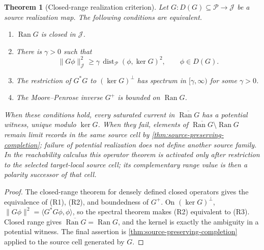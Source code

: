 \documentclass[11pt]{article}
\numberwithin{section}{part}
\theoremstyle{plain}
\newtheorem{theorem}{Theorem}[section]
\theoremstyle{definition}
\theoremstyle{remark}
\newcommand{\dist}{\operatorname{dist}}
\newcommand{\Ran}{\operatorname{Ran}}
\begin{document}
\begin{theorem}[Closed-range realization criterion]
\label{thm:closed-range-realization}
Let \(G:D(G)\subseteq\mathcal P\to\mathcal J\) be a source realization
map.  The following conditions are equivalent.
\begin{enumerate}[label=\textup{(R\arabic*)}]
\item \(\Ran G\) is closed in \(\mathcal J\).
\item There is \(\gamma>0\) such that
  \begin{equation}
   \label{eq:closed-range-poincare}
   \|G\phi\|_{\mathcal J}^{2}
   \ge\gamma\,\dist_{\mathcal P}(\phi,\ker G)^{2},
   \qquad \phi\in D(G).
  \end{equation}
\item The restriction of \(G^*G\) to \((\ker G)^\perp\) has spectrum in
  \([\gamma,\infty)\) for some \(\gamma>0\).
\item The Moore--Penrose inverse \(G^+\) is bounded on \(\Ran G\).
\end{enumerate}
When these conditions hold, every saturated current in
\(\overline{\Ran G}\) has a potential witness, unique modulo \(\ker G\).
When they fail, elements of \(\overline{\Ran G}\setminus\Ran G\) remain
limit records in the same source cell by
\cref{thm:source-preserving-completion}; failure of potential realization
does not define another source family.  In the reachability calculus this
operator theorem is activated only after restriction to the selected
target-local source cell; its complementary range value is then a polarity
successor of that cell.
\end{theorem}

\begin{proof}
The closed-range theorem for densely defined closed operators gives the
equivalence of \textup{(R1)}, \textup{(R2)}, and boundedness of \(G^+\).
On \((\ker G)^\perp\),
\(\|G\phi\|^2=\langle G^*G\phi,\phi\rangle\), so the spectral theorem makes
\textup{(R2)} equivalent to \textup{(R3)}.  Closed range gives
\(\overline{\Ran G}=\Ran G\), and the kernel is exactly the ambiguity in a
potential witness.  The final assertion is
\cref{thm:source-preserving-completion} applied to the source cell generated
by \(G\).
\end{proof}
\end{document}
